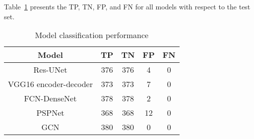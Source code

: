 Table~\ref{tab:table_performance} presents the TP, TN, FP, and FN for all models with respect to the test set. 
\begin{table}[]
	\centering
	\caption{Model classification performance}
	\label{tab:table_performance}
	\begin{tabular}{ccccc} \hline
		Model& TP & TN & FP & FN \\ \hline
		Res-UNet & 376 & 376 & 4 & 0 \\ 
		VGG16 encoder-decoder & 373 & 373 & 7 & 0 \\ 
		FCN-DenseNet & 378 & 378 & 2 & 0 \\ 
		PSPNet & 368 & 368 & 12 & 0 \\ 
		GCN & 380 & 380 & 0 & 0 \\ \hline
	\end{tabular}	
\end{table}


